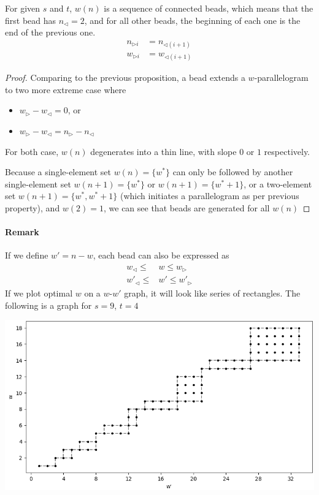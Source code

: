 \documentclass[]{article}
\begin{document}
\vspace{1cm}
\begin{lemma}
	For given $s$ and $t$, $w(n)$ is a sequence of connected beads, which means that the first bead has $n_{\triangleleft} = 2$, and for all other beads, the beginning of each one is the end of the previous one.
\begin{align*}
n_{\triangleright i} &= n_{\triangleleft (i+1)}\\
w_{\triangleright i} &= w_{\triangleleft (i+1)}
\end{align*}

\end{lemma}
\begin{proof}
	Comparing to the previous proposition, a bead extends a $w$-parallelogram to two more extreme case where
	\begin{itemize}
		\item $w_{\triangleright} - w_{\triangleleft} = 0$, or
		\item $w_{\triangleright} - w_{\triangleleft} = n_{\triangleright} - n_{\triangleleft}$
	\end{itemize}
	For both case, $w(n)$ degenerates into a thin line, with slope $0$ or $1$ respectively.

	Because a single-element set $w(n) = \{w^*\}$ can only be followed by another single-element set $w(n+1) = \{w^*\}$ or $w(n+1)=\{w^*+1\}$, or a two-element set $w(n+1) = \{w^*, w^*+1\}$ (which initiates a parallelogram as per previous property), and $w(2) = {1}$, we can see that beads are generated for all $w(n)$
\end{proof}

\paragraph{Remark}
If we define $w' = n-w$, each bead can also be expressed as
\begin{align*}
	w_{\triangleleft} \le &w \le w_{\triangleright} \\
	w'_{\triangleleft} \le &w' \le w'_{\triangleright}
\end{align*}
If we plot optimal $w$ on a $w$-$w'$ graph, it will look like series of rectangles. The following is a graph for $s = 9$, $t = 4$

\includegraphics[scale=0.7]{w-n.png}
\end{document}
